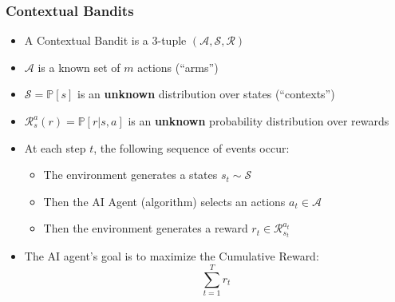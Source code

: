 \documentclass[handout]{beamer}
\begin{document}
\begin{frame}
\frametitle{Contextual Bandits}
\pause
\begin{itemize}[<+->]
\item A Contextual Bandit is a 3-tuple $(\mathcal{A}, \mathcal{S},  \mathcal{R})$
\item $\mathcal{A}$ is a known set of $m$ actions (``arms'')
\item $\mathcal{S} = \mathbb{P}[s]$ is an {\bf unknown} distribution over states (``contexts'')
\item $\mathcal{R}^a_s(r) = \mathbb{P}[r|s,a]$ is an {\bf unknown} probability distribution over rewards
\item At each step $t$, the following sequence of events occur:
\begin{itemize}
\item The environment generates a states $s_t \sim \mathcal{S}$
\item Then the AI Agent (algorithm) selects an actions $a_t \in \mathcal{A}$
\item Then the environment generates a reward $r_t \in \mathcal{R}^{a_t}_{s_t}$
\end{itemize}
\item The AI agent's goal is to maximize the Cumulative Reward:
$$\sum_{t=1}^T r_t$$
\end{itemize}
\end{frame}
\end{document}
